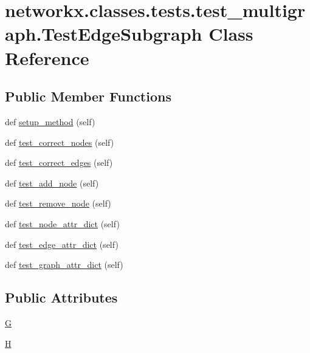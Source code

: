 \hypertarget{classnetworkx_1_1classes_1_1tests_1_1test__multigraph_1_1TestEdgeSubgraph}{}\section{networkx.\+classes.\+tests.\+test\+\_\+multigraph.\+Test\+Edge\+Subgraph Class Reference}
\label{classnetworkx_1_1classes_1_1tests_1_1test__multigraph_1_1TestEdgeSubgraph}
\subsection*{Public Member Functions}
\begin{DoxyCompactItemize}
\item 
def \hyperlink{classnetworkx_1_1classes_1_1tests_1_1test__multigraph_1_1TestEdgeSubgraph_ace33438ab943595e7c675cf2569b0043}{setup\+\_\+method} (self)
\item 
def \hyperlink{classnetworkx_1_1classes_1_1tests_1_1test__multigraph_1_1TestEdgeSubgraph_a619046d6646d900312128715e383cb8a}{test\+\_\+correct\+\_\+nodes} (self)
\item 
def \hyperlink{classnetworkx_1_1classes_1_1tests_1_1test__multigraph_1_1TestEdgeSubgraph_a8a5094fa7eef277f380611f572641897}{test\+\_\+correct\+\_\+edges} (self)
\item 
def \hyperlink{classnetworkx_1_1classes_1_1tests_1_1test__multigraph_1_1TestEdgeSubgraph_a9eb15430f70d47ffbbb670cff1e0a105}{test\+\_\+add\+\_\+node} (self)
\item 
def \hyperlink{classnetworkx_1_1classes_1_1tests_1_1test__multigraph_1_1TestEdgeSubgraph_a0601b228c8d530970dc1bd77fe0e3ce8}{test\+\_\+remove\+\_\+node} (self)
\item 
def \hyperlink{classnetworkx_1_1classes_1_1tests_1_1test__multigraph_1_1TestEdgeSubgraph_a02dac93c3768af51335285b23d9b5b2a}{test\+\_\+node\+\_\+attr\+\_\+dict} (self)
\item 
def \hyperlink{classnetworkx_1_1classes_1_1tests_1_1test__multigraph_1_1TestEdgeSubgraph_aba7610c74edde65e4d04e055ac5c259a}{test\+\_\+edge\+\_\+attr\+\_\+dict} (self)
\item 
def \hyperlink{classnetworkx_1_1classes_1_1tests_1_1test__multigraph_1_1TestEdgeSubgraph_a53f6c7ba5a3904a756a6063de440b78f}{test\+\_\+graph\+\_\+attr\+\_\+dict} (self)
\end{DoxyCompactItemize}
\subsection*{Public Attributes}
\begin{DoxyCompactItemize}
\item 
\hyperlink{classnetworkx_1_1classes_1_1tests_1_1test__multigraph_1_1TestEdgeSubgraph_a802fd66c48738e2322309b3f0968a48f}{G}
\item 
\hyperlink{classnetworkx_1_1classes_1_1tests_1_1test__multigraph_1_1TestEdgeSubgraph_af8b1953ee52af2f20b3d9884d6bd9ab2}{H}
\end{DoxyCompactItemize}


